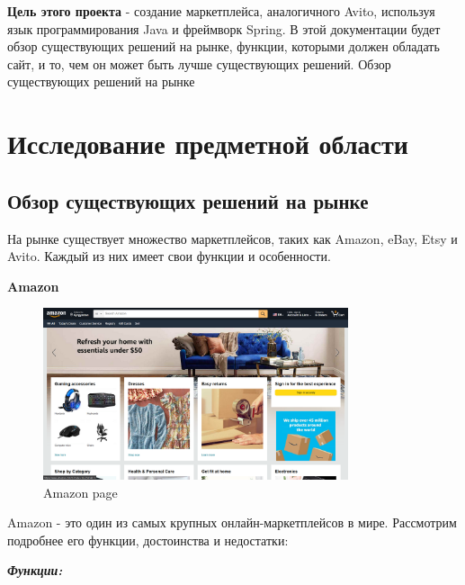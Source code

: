 \textbf{Цель этого проекта} - создание маркетплейса, аналогичного Avito, используя язык программирования Java и фреймворк Spring. В этой документации будет обзор существующих решений на рынке, функции, которыми должен обладать сайт, и то, чем он может быть лучше существующих решений.
Обзор существующих решений на рынке



\section{Исследование предметной области}
\subsection{Обзор существующих решений на рынке}


На рынке существует множество маркетплейсов, таких как Amazon, eBay, Etsy и Avito. Каждый из них имеет свои функции и особенности.


\textbf{Amazon}

\begin{figure}[h]
    \centering
    \includegraphics[width=0.8\textwidth]{./images/amazon_main.png}
    \caption{Amazon page}
\end{figure}

Amazon - это один из самых крупных онлайн-маркетплейсов в мире. Рассмотрим подробнее его функции, достоинства и недостатки:

\textbf{\emph{Функции:}}

